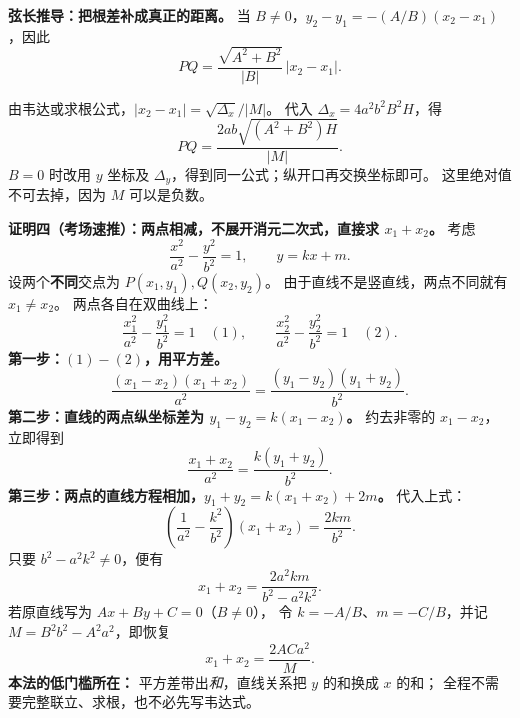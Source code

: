 \clearpage
\begin{proofbox}
\textbf{弦长推导：把根差补成真正的距离。}
当 $B\ne0$，$y_2-y_1=-(A/B)(x_2-x_1)$，因此
\[
 PQ=\frac{\sqrt{A^2+B^2}}{|B|}\,|x_2-x_1|.
\]

由韦达或求根公式，$|x_2-x_1|=\sqrt{\Delta_x}/|M|$。
代入 $\Delta_x=4a^2b^2B^2H$，得
\[
 PQ=\frac{2ab\sqrt{(A^2+B^2)H}}{|M|}.
\]
$B=0$ 时改用 $y$ 坐标及 $\Delta_y$，得到同一公式；纵开口再交换坐标即可。
这里绝对值不可去掉，因为 $M$ 可以是负数。
\end{proofbox}
\clearpage
\begin{proofbox}
\textbf{证明四（考场速推）：两点相减，不展开消元二次式，直接求 $x_1+x_2$。}
考虑
\[
 \frac{x^2}{a^2}-\frac{y^2}{b^2}=1,\qquad y=kx+m.
\]
设两个\textbf{不同}交点为 $P(x_1,y_1),Q(x_2,y_2)$。
由于直线不是竖直线，两点不同就有 $x_1\ne x_2$。
两点各自在双曲线上：
\[
 \frac{x_1^2}{a^2}-\frac{y_1^2}{b^2}=1\quad(1),\qquad
 \frac{x_2^2}{a^2}-\frac{y_2^2}{b^2}=1\quad(2).
\]
\textbf{第一步：$(1)-(2)$，用平方差。}
\[
 \frac{(x_1-x_2)(x_1+x_2)}{a^2}
 =\frac{(y_1-y_2)(y_1+y_2)}{b^2}.
\]
\textbf{第二步：直线的两点纵坐标差为 $y_1-y_2=k(x_1-x_2)$。}
约去非零的 $x_1-x_2$，立即得到
\[
 \boxed{\frac{x_1+x_2}{a^2}=\frac{k(y_1+y_2)}{b^2}}.
\]
\textbf{第三步：两点的直线方程相加，$y_1+y_2=k(x_1+x_2)+2m$。}
代入上式：
\[
 \left(\frac1{a^2}-\frac{k^2}{b^2}\right)(x_1+x_2)
 =\frac{2km}{b^2}.
\]
只要 $b^2-a^2k^2\ne0$，便有
\[
 \boxed{x_1+x_2=\frac{2a^2km}{b^2-a^2k^2}}.
\]
若原直线写为 $Ax+By+C=0$（$B\ne0$），
令 $k=-A/B$、$m=-C/B$，并记 $M=B^2b^2-A^2a^2$，即恢复
\[
 \boxed{x_1+x_2=\frac{2ACa^2}{M}}.
\]
\textbf{本法的低门槛所在：} 平方差带出\emph{和}，直线关系把 $y$ 的和换成 $x$ 的和；
全程不需要完整联立、求根，也不必先写韦达式。
\end{proofbox}
\clearpage

